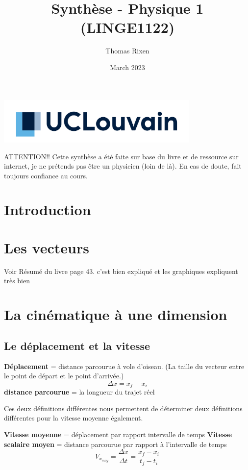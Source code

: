 \documentclass{article}
\title{Synthèse - Physique 1 (LINGE1122)}
\author{Thomas Rixen}
\date{March 2023}
\begin{document}
\maketitle
\begin{center}
    \includegraphics[width=10cm]{Image/1200px-UCLouvain_logo.svg.png}
\end{center}

ATTENTION!! Cette synthèse a été faite sur base du livre et de ressource sur internet, je ne prétends pas être un physicien (loin de là). En cas de doute, fait toujours confiance au cours.
\cleardoublepage{}

\tableofcontents

\newpage
\section{Introduction}
\section{Les vecteurs}
Voir Résumé du livre page 43. c'est bien expliqué et les graphiques expliquent très bien


\section{La cinématique à une dimension}
\subsection{Le déplacement et la vitesse}
\textbf{Déplacement} = distance parcourue à vole d'oiseau. (La taille du vecteur entre le point de départ et le point d'arrivée.)
\[\Delta x = x_f -x_i\]
\textbf{distance parcourue} = la longueur du trajet réel
\newline

Ces deux définitions différentes nous permettent de déterminer deux définitions différentes pour la vitesse moyenne également.
\newline

\noindent
\textbf{Vitesse moyenne} = déplacement par rapport intervalle de temps
\newline
\textbf{Vitesse scalaire moyen} = distance parcourue par rapport à l'intervalle de temps
\newline
\[V_{x_{moy}} = \frac{\Delta x}{\Delta t} = \frac{x_f - x_i}{t_f - t_i}\]
\end{document}
